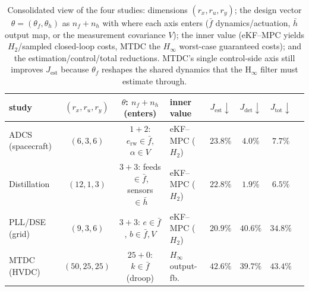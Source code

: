 \documentclass[twocolumn,amsthm]{autart}
\begin{document}
\begin{table}[t]
\centering
\caption{Consolidated view of the four studies: dimensions $(r_x,r_u,r_y)$; the
design vector $\theta=(\theta_f,\theta_h)$ as $n_f{+}n_h$ with where each axis enters
($\bar f$ dynamics/actuation, $\bar h$ output map, or the measurement covariance
$V$); the inner value (eKF--MPC yields $H_2$/sampled closed-loop costs, MTDC the
$H_\infty$ worst-case guaranteed costs); and the estimation/control/total reductions.
MTDC's single control-side axis still improves $J_{\mathrm{est}}$ because $\theta_f$
reshapes the shared dynamics that the H$_\infty$ filter must estimate through.}
\label{tab:formulations}
\begin{tabular}{lcclcccc}
\hline
study & $(r_x,r_u,r_y)$ & $\theta$: $n_f{+}n_h$ (enters) & inner value
& $J_{\mathrm{est}}\!\downarrow$ & $J_{\mathrm{det}}\!\downarrow$ & $J_{\mathrm{tot}}\!\downarrow$\\
\hline
ADCS (spacecraft) & $(6,3,6)$   & $1{+}2$: $e_{\mathrm{rw}}\!\in\!\bar f$, $\alpha\!\in\!V$ & eKF--MPC ($H_2$) & $23.8\%$ & $4.0\%$  & $\mathbf{7.7\%}$\\
Distillation      & $(12,1,3)$  & $3{+}3$: feeds $\in\!\bar f$, sensors $\in\!\bar h$ & eKF--MPC ($H_2$) & $22.8\%$ & $1.9\%$  & $\mathbf{6.5\%}$\\
PLL/DSE (grid)    & $(9,3,6)$   & $3{+}3$: $e\!\in\!\bar f$, $b\!\in\!\bar f,V$ & eKF--MPC ($H_2$) & $20.9\%$ & $40.6\%$ & $\mathbf{34.8\%}$\\
MTDC (HVDC)       & $(50,25,25)$& $25{+}0$: $k\!\in\!\bar f$ (droop)            & $H_\infty$ output-fb. & $42.6\%$ & $39.7\%$ & $\mathbf{43.4\%}$\\
\hline
\end{tabular}
\end{table}
\end{document}
